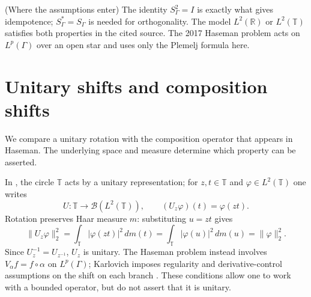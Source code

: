 \begin{cthnota}{(Where the assumptions enter)}
The identity $S_\Gamma^2=I$ is exactly what gives idempotence;
$S_\Gamma^*=S_\Gamma$ is needed for orthogonality. The model
$L^2(\mathbb R)$ or $L^2(\mathbb T)$ satisfies both properties in the cited
source. The 2017 Haseman problem acts on $L^p(\Gamma)$ over an open star and
uses only the Plemelj formula here.
\end{cthnota}

\section{Unitary shifts and composition shifts}

We compare a unitary rotation with the composition operator that appears in
Haseman. The underlying space and measure determine which property can be asserted.

In \cite[§1, p.~20]{BFK2006}, the circle $\mathbb T$ acts by a unitary representation;
for $z,t\in\mathbb T$ and $\varphi\in L^2(\mathbb T)$ one writes
\[
 U:\mathbb T\to\mathcal B(L^2(\mathbb T)),
 \qquad
 (U_z\varphi)(t)=\varphi(zt).
\]
Rotation preserves Haar measure $m$: substituting $u=zt$ gives
\[
 \|U_z\varphi\|_2^2=\int_{\mathbb T}|\varphi(zt)|^2\,dm(t)
 =\int_{\mathbb T}|\varphi(u)|^2\,dm(u)=\|\varphi\|_2^2.
\]
Since $U_z^{-1}=U_{z^{-1}}$, $U_z$ is unitary. The Haseman problem instead
involves $V_\alpha f=f\circ\alpha$ on $L^p(\Gamma)$; Karlovich imposes
regularity and derivative-control assumptions on the shift on each branch
\cite[§2, p.~467]{Karlovich2017}. These conditions allow one to work with a
bounded operator, but do not assert that it is unitary.

\begin{center}
\end{center}

